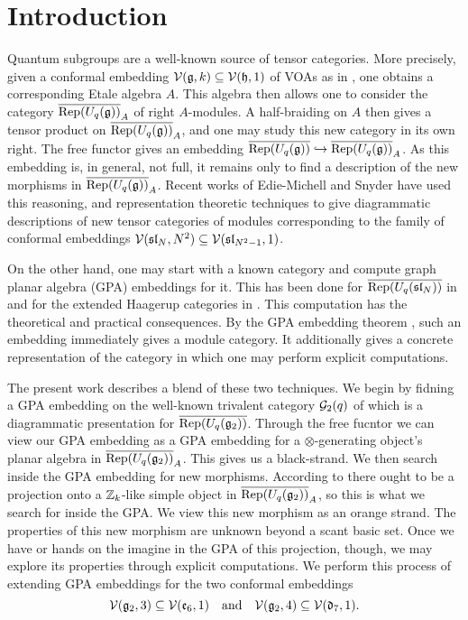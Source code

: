 \section{Introduction}\label{sec:intro}
Quantum subgroups are a well-known source of tensor categories.
More precisely, given a conformal embedding $\mathcal{V}(\mathfrak{g},k) \subseteq \mathcal{V}(\mathfrak{h},1)$ of VOAs 
as in \cite{DMNO}, one obtains a corresponding Etale algebra $A$.
This algebra then allows one to consider the category $\overline{\operatorname{Rep}(U_q(\mathfrak{g}))}_A$ of right $A$-modules.
A half-braiding on $A$ then gives a tensor product on $\overline{\operatorname{Rep}(U_q(\mathfrak{g}))}_A$, and one may study this
new category in its own right.
The free functor gives an embedding $\overline{\operatorname{Rep}(U_q(\mathfrak{g}))} \hookrightarrow \overline{\operatorname{Rep}(U_q(\mathfrak{g}))}_A$.
As this embedding is, in general, not full, it remains only to 
find a description of the new morphisms in $\overline{\operatorname{Rep}(U_q(\mathfrak{g}))}_A$.
Recent works of Edie-Michell and Snyder \cite{cain_noah} have used this reasoning, and 
representation theoretic techniques to give diagrammatic descriptions of new tensor categories of modules
corresponding to the family of conformal embeddings $\mathcal{V}(\mathfrak{sl}_N,N^2) \subseteq \mathcal{V}(\mathfrak{sl}_{N^2-1},1)$.

On the other hand, one may start with a known category and compute graph planar algebra (GPA) embeddings for it.
This has been done for $\overline{\operatorname{Rep}(U_q(\mathfrak{sl}_N))}$ in \cite{Cain_Dan} and for the 
extended Haagerup categories in \cite{extended_haagerup}.
This computation has the theoretical and practical consequences.
By the GPA embedding theorem \cite{something}, such an embedding immediately gives a module category.
It additionally gives a concrete representation of the category in which one may perform explicit computations.

The present work describes a blend of these two techniques.
We begin by fidning a GPA embedding on the well-known trivalent category $\mathcal{G}_2(q)$ of \cite{Kuperberg,tricats}
which is a diagrammatic presentation for $\overline{\operatorname{Rep}(U_q(\mathfrak{g}_2))}$.
Through the free fucntor we can view our GPA embedding as a GPA embedding for a $\otimes$-generating 
object's planar algebra in $\overline{\operatorname{Rep}(U_q(\mathfrak{g}_2))}_A$.
This gives us a black-strand.
We then search inside the GPA embedding for new morphisms.
According to \cite{DMNO} there ought to be a projection onto a $\mathbb{Z}_k$-like simple object in $\overline{\operatorname{Rep}(U_q(\mathfrak{g}_2))}_A$,
so this is what we search for inside the GPA.
We view this new morphism as an orange strand.
The properties of this new morphism are unknown beyond a scant basic set.
Once we have or hands on the imagine in the GPA of this projection, though, 
we may explore its properties through explicit computations.
We perform this process of extending GPA embeddings for the two conformal embeddings
\begin{equation}\label{eq:conf-embs}
    \mathcal{V}(\mathfrak{g}_2,3) \subseteq \mathcal{V}(\mathfrak{e}_6,1) \quad\text{and}\quad \mathcal{V}(\mathfrak{g}_2,4) \subseteq \mathcal{V}(\mathfrak{d}_7,1).
\end{equation}

